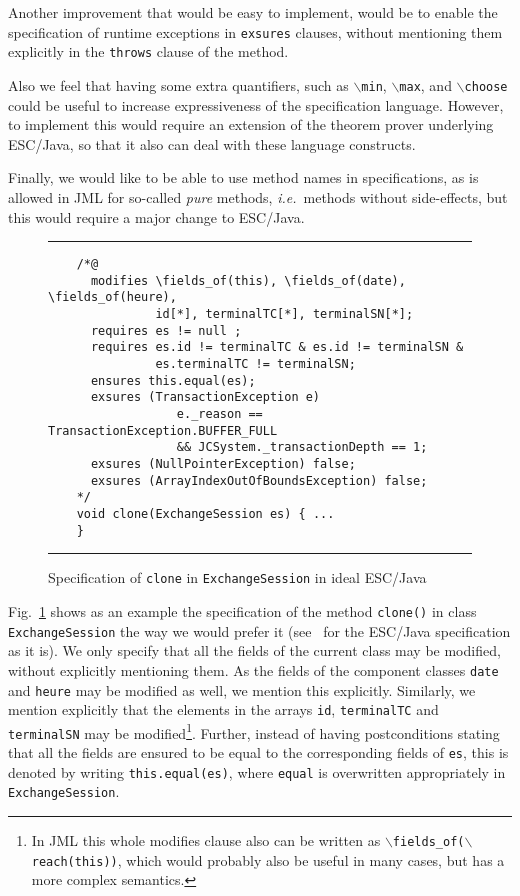 \documentclass[a4paper]{llncs}
\newcommand{\fieldsof}{\(\backslash\)\texttt{fields\_of}}
\newcommand{\reach}{\(\backslash\)\texttt{reach}}
\begin{document}
Another improvement that would be easy to implement, would be to
enable the specification of runtime exceptions in \texttt{exsures}
clauses, without mentioning them explicitly in the \texttt{throws}
clause of the method.

Also we feel that having some extra quantifiers, such as
\texttt{\(\backslash\)min},
\texttt{\(\backslash\)max}, and \texttt{\(\backslash\)choose} could be 
useful to increase expressiveness of the specification
language. However, to implement this would require an extension of the 
theorem prover underlying ESC/Java, so that it also can deal with
these language constructs.

Finally, we would like to be able to use method
names in specifications, as is allowed in JML for so-called
\emph{pure} methods, \emph{i.e.}~methods without
side-effects, but this would require a major change to ESC/Java.


\begin{figure}[t]
\rule{\linewidth}{0.3mm}
\begin{verbatim}
    /*@
      modifies \fields_of(this), \fields_of(date), \fields_of(heure),
               id[*], terminalTC[*], terminalSN[*];
      requires es != null ;
      requires es.id != terminalTC & es.id != terminalSN &
               es.terminalTC != terminalSN;
      ensures this.equal(es);
      exsures (TransactionException e) 
                  e._reason == TransactionException.BUFFER_FULL 
                  && JCSystem._transactionDepth == 1; 
      exsures (NullPointerException) false;
      exsures (ArrayIndexOutOfBoundsException) false;
    */
    void clone(ExchangeSession es) { ...
    } 
\end{verbatim}
\caption{Specification of \texttt{clone} in \texttt{ExchangeSession}
in ideal ESC/Java}
\label{FigIdealESC}
\rule{\linewidth}{0.3mm}
\end{figure}

Fig.~\ref{FigIdealESC} shows as an example the
specification of the method \texttt{clone()} in class
\texttt{ExchangeSession} the way we would prefer it (see~\cite{CatanoH01Url} for the
ESC/Java specification as it is). We only specify that all the fields
of the current class may be modified, without explicitly mentioning
them. As
the fields of the component classes \texttt{date} and
\texttt{heure} may be modified as well, we mention this
explicitly. Similarly, we mention explicitly that the elements in the
arrays \texttt{id}, \texttt{terminalTC} and \texttt{terminalSN} may be
modified\footnote{In JML this whole modifies clause also can be written
as \texttt{\fieldsof(\reach(this))}, which would probably also be
useful in many cases, but has a more complex semantics.}. Further, instead of
having postconditions stating that all the fields are ensured to be
equal to the corresponding fields of \texttt{es}, this is denoted by
writing \texttt{this.equal(es)}, where \texttt{equal} is overwritten
appropriately in \texttt{ExchangeSession}.
\end{document}
